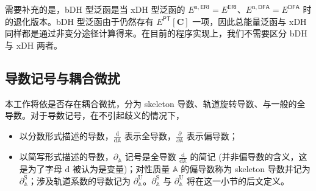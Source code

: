 需要补充的是，bDH 型泛函是当 xDH 型泛函的 $E^{\mathrm{n}, \textsf{ERI}} = E^\textsf{ERI}$、$E^{\mathrm{n}, \textsf{DFA}} = E^\textsf{DFA}$ 时的退化版本。bDH 型泛函由于仍然存有 $E^\textsf{PT} [\mathbf{C}]$ 一项，因此总能量泛函与 xDH 同样都是通过非变分途径计算得来。在目前的程序实现上，我们不需要区分 bDH 与 xDH 两者。

\subsection{导数记号与耦合微扰}

本工作将依是否存在耦合微扰，分为 skeleton 导数、轨道旋转导数、与一般的全导数。对于导数记号，在不引起歧义的情况下，
\begin{itemize}[nosep]
  \item 以分数形式描述的导数，$\frac{\mathrm{d}}{\mathrm{d} \mathbb{A}}$ 表示全导数，$\frac{\partial}{\partial \mathbb{A}}$ 表示偏导数；
  \item 以简写形式描述的导数，$\partial_{\mathbb{A}}$ 记号是\textsf{全导数} $\frac{\mathrm{d}}{\mathrm{d} \mathbb{A}}$ 的简记 (并非偏导数的含义，这是为了字母 $\mathrm{d}$ 被认为是变量)；对性质量 $\mathbb{A}$ 的偏导数称为 skeleton 导数并记为 $\partial_{\mathbb{A}}^{\mathrm{S}}$；涉及轨道系数的导数记为 $\partial_{\mathbb{A}}^{\mathrm{U}}$。$\partial_{\mathbb{A}}^{\mathrm{S}}$ 与 $\partial_{\mathbb{A}}^{\mathrm{U}}$ 将在这一小节的后文定义。
\end{itemize}

